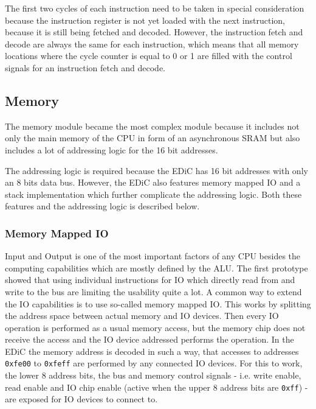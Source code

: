 The first two cycles of each instruction need to be taken in special consideration because the instruction register is not yet loaded with the next instruction, because it is still being fetched and decoded.
However, the instruction fetch and decode are always the same for each instruction, which means that all memory locations where the cycle counter is equal to 0 or 1 are filled with the control signals for an instruction fetch and decode.

\subsection{Memory}\label{sec:memory}
The memory module became the most complex module because it includes not only the main memory of the \gls{CPU} in form of an asynchronous \gls{SRAM} but also includes a lot of addressing logic for the 16 bit addresses.

The addressing logic is required because the \gls{EDiC} has 16 bit addresses with only an 8 bits data bus.
However, the \gls{EDiC} also features memory mapped \gls{IO} and a stack implementation which further complicate the addressing logic.
Both these features and the addressing logic is described below.

\subsubsection{Memory Mapped \gls{IO}}
Input and Output is one of the most important factors of any \gls{CPU} besides the computing capabilities which are mostly defined by the \gls{ALU}.
The first prototype showed that using individual instructions for \gls{IO} which directly read from and write to the bus are limiting the usability quite a lot.
A common way to extend the \gls{IO} capabilities is to use so-called memory mapped \gls{IO}.
This works by splitting the address space between actual memory and \gls{IO} devices.
Then every \gls{IO} operation is performed as a usual memory access, but the memory chip does not receive the access and the \gls{IO} device addressed performs the operation.
In the \gls{EDiC} the memory address is decoded in such a way, that accesses to addresses \texttt{0xfe00} to \texttt{0xfeff} are performed by any connected \gls{IO} devices.
For this to work, the lower 8 address bits, the bus and memory control signals - i.e. write enable, read enable and \gls{IO} chip enable (active when the upper 8 address bits are \texttt{0xff}) - are exposed for \gls{IO} devices to connect to.

